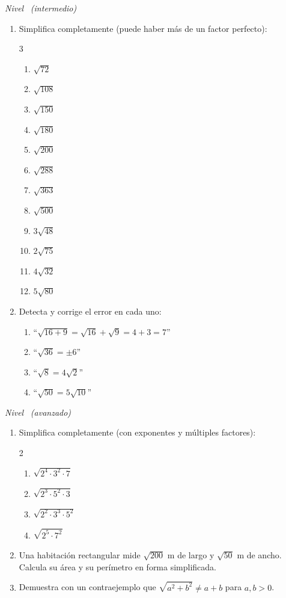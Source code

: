 \documentclass[11pt, letterpaper]{article}
\begin{document}
\textit{Nivel} \bigstar\bigstar\ \textit{(intermedio)}

\begin{enumerate}[label=\textbf{\arabic*.}, leftmargin=*, resume]
  \item Simplifica completamente (puede haber más de un factor perfecto):
  \begin{multicols}{3}
  \begin{enumerate}[label=\alph*)]
    \item $\sqrt{72}$
    \item $\sqrt{108}$
    \item $\sqrt{150}$
    \item $\sqrt{180}$
    \item $\sqrt{200}$
    \item $\sqrt{288}$
    \item $\sqrt{363}$
    \item $\sqrt{500}$
    \item $3\sqrt{48}$
    \item $2\sqrt{75}$
    \item $4\sqrt{32}$
    \item $5\sqrt{80}$
  \end{enumerate}
  \end{multicols}

  \item Detecta y corrige el error en cada uno:
  \begin{enumerate}[label=\alph*)]
    \item ``$\sqrt{16+9} = \sqrt{16}+\sqrt{9} = 4+3 = 7$''
    \item ``$\sqrt{36} = \pm 6$''
    \item ``$\sqrt{8} = 4\sqrt{2}$''
    \item ``$\sqrt{50} = 5\sqrt{10}$''
  \end{enumerate}
\end{enumerate}

\textit{Nivel} \bigstar\bigstar\bigstar\ \textit{(avanzado)}

\begin{enumerate}[label=\textbf{\arabic*.}, leftmargin=*, resume]
  \item Simplifica completamente (con exponentes y múltiples factores):
  \begin{multicols}{2}
  \begin{enumerate}[label=\alph*)]
    \item $\sqrt{2^4 \cdot 3^2 \cdot 7}$
    \item $\sqrt{2^3 \cdot 5^2 \cdot 3}$
    \item $\sqrt{2^2 \cdot 3^3 \cdot 5^2}$
    \item $\sqrt{2^5 \cdot 7^2}$
  \end{enumerate}
  \end{multicols}

  \item Una habitación rectangular mide $\sqrt{200}$ m de largo y $\sqrt{50}$ m de ancho. Calcula su área y su perímetro en forma simplificada.

  \item Demuestra con un contraejemplo que $\sqrt{a^2 + b^2} \neq a + b$ para $a, b > 0$.
\end{enumerate}
\end{document}

